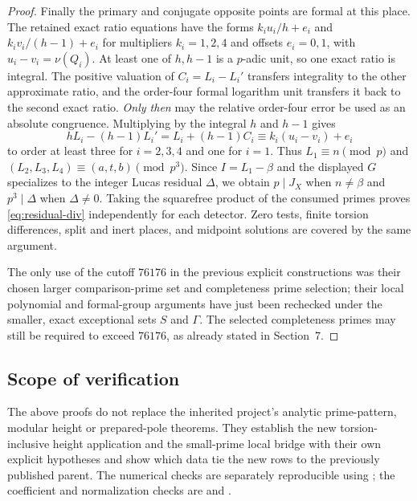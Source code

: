 \documentclass[11pt,a4paper]{article}
\begin{document}
\begin{proof}
Finally the primary and conjugate opposite points are
formal at this place. The retained exact ratio equations
have the forms
$k_i u_i/h+e_i$ and $k_i v_i/(h-1)+e_i$
for multipliers $k_i=1,2,4$ and offsets $e_i=0,1$,
with $u_i-v_i=\nu(Q_i)$.
At least one of $h,h-1$ is a $p$-adic unit,
so one exact ratio is integral. The positive valuation
of $C_i=L_i-L_i'$ transfers integrality to the other
approximate ratio, and the order-four formal logarithm
unit transfers it back to the second exact ratio.
\emph{Only then} may the relative order-four error be used
as an absolute congruence.
Multiplying by the integral $h$ and $h-1$ gives
\[
 hL_i-(h-1)L_i'
   =L_i+(h-1)C_i
   \equiv k_i(u_i-v_i)+e_i
\]
to order at least three for $i=2,3,4$ and one for $i=1$.
Thus $L_1\equiv n\pmod p$ and
$(L_2,L_3,L_4)\equiv(a,t,b)\pmod{p^3}$.
Since $I=L_1-\beta$ and the displayed $G$ specializes
to the integer Lucas residual $\Delta$, we obtain
$p\mid J_X$ when $n\ne\beta$ and $p^3\mid\Delta$
when $\Delta\ne0$.
Taking the squarefree product of the consumed primes
proves \eqref{eq:residual-div} independently for each
detector. Zero tests, finite torsion differences,
split and inert places, and midpoint solutions are
covered by the same argument.

The only use of the cutoff $76176$ in the previous
explicit constructions was their chosen larger
comparison-prime set and completeness prime selection;
their local polynomial and formal-group arguments have
just been rechecked under the smaller, exact exceptional
sets $S$ and $\Gamma$. The selected completeness primes
may still be required to exceed $76176$,
as already stated in Section~7.
\end{proof}

\subsection{Scope of verification}

The above proofs do not replace the inherited
project's analytic prime-pattern, modular height or
prepared-pole theorems. They establish the new
torsion-inclusive height application and the
small-prime local bridge with their own explicit
hypotheses and show which data tie the new rows to
the previously published parent. The numerical
checks are separately reproducible using
; the coefficient and
normalization checks are  and
.
\end{document}
